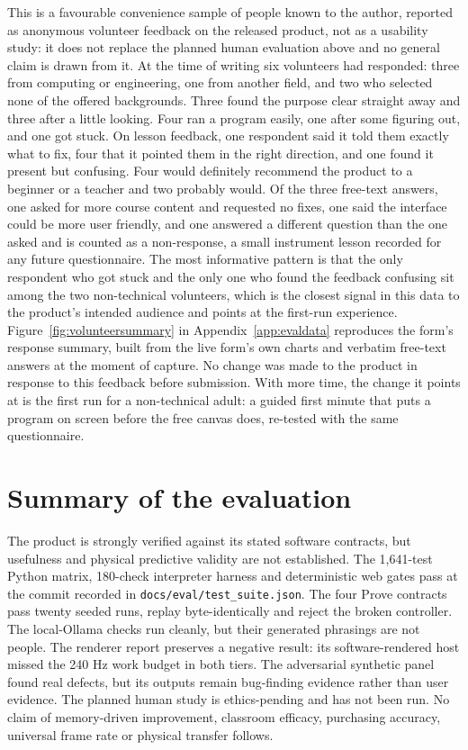 \documentclass[11pt,a4paper]{report}
\newif\ifhumanfeedback
\begin{document}
This is a favourable convenience sample of people known to the author, reported as anonymous volunteer feedback on the released product, not as a usability study: it does not replace the planned human evaluation above and no general claim is drawn from it. At the time of writing six volunteers had responded: three from computing or engineering, one from another field, and two who selected none of the offered backgrounds. Three found the purpose clear straight away and three after a little looking. Four ran a program easily, one after some figuring out, and one got stuck. On lesson feedback, one respondent said it told them exactly what to fix, four that it pointed them in the right direction, and one found it present but confusing. Four would definitely recommend the product to a beginner or a teacher and two probably would. Of the three free-text answers, one asked for more course content and requested no fixes, one said the interface could be more user friendly, and one answered a different question than the one asked and is counted as a non-response, a small instrument lesson recorded for any future questionnaire. The most informative pattern is that the only respondent who got stuck and the only one who found the feedback confusing sit among the two non-technical volunteers, which is the closest signal in this data to the product's intended audience and points at the first-run experience. Figure~\ref{fig:volunteersummary} in Appendix~\ref{app:evaldata} reproduces the form's response summary, built from the live form's own charts and verbatim free-text answers at the moment of capture. No change was made to the product in response to this feedback before submission. With more time, the change it points at is the first run for a non-technical adult: a guided first minute that puts a program on screen before the free canvas does, re-tested with the same questionnaire.
\fi

\section{Summary of the evaluation}
The product is strongly verified against its stated software contracts, but usefulness and physical predictive validity are not established. The 1,641-test Python matrix, 180-check interpreter harness and deterministic web gates pass at the commit recorded in \texttt{docs/eval/test\_suite.json}. The four Prove contracts pass twenty seeded runs, replay byte-identically and reject the broken controller. The local-Ollama checks run cleanly, but their generated phrasings are not people. The renderer report preserves a negative result: its software-rendered host missed the 240 Hz work budget in both tiers. The adversarial synthetic panel found real defects, but its outputs remain bug-finding evidence rather than user evidence.\ifhumanfeedback{} Six adult volunteers gave anonymous feedback on the released product, favourable overall, with the two non-technical respondents supplying the only stuck run and the only confusing-feedback rating; it is feedback, not a study.\fi{} The planned human study is ethics-pending and has not been run. No claim of memory-driven improvement, classroom efficacy, purchasing accuracy, universal frame rate or physical transfer follows.
\end{document}

